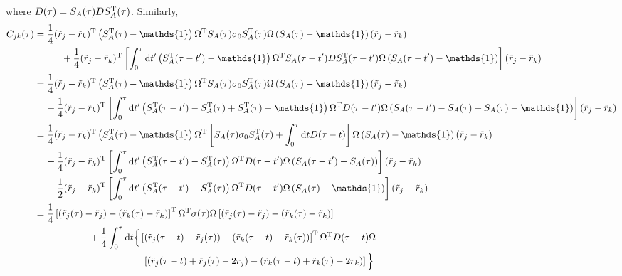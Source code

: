 \documentclass[%
reprint,
superscriptaddress,
nofootinbib,
 amsmath,amssymb,
prx,
floatfix,
]{revtex4-2}
\begin{document}
where $D(\tau) = S_A(\tau)D S_A^{\rm T}(\tau)$. Similarly, 
\begin{align*}
C_{jk} (\tau) &=   \frac{1}{4} (\tilde{r}_j - \tilde{r}_k)^{\rm T}   \left(S^{\rm T}_A(\tau) - \mathds{1} \right)  \Omega^{\rm T} S_A(\tau) \sigma_0 S^{\rm T}_A(\tau)\Omega  \left(S_A(\tau) - \mathds{1} \right)   (\tilde{r}_j - \tilde{r}_k)   \nonumber \\ 
& \hspace{1cm}+ \frac{1}{4} (\tilde{r}_j - \tilde{r}_k)^{\rm T}  \left[  \int_0^\tau \text{d} t'    \left(S^{\rm T}_A(\tau - t') - \mathds{1} \right) \Omega^{\rm T} S_A(\tau - t')   D S_A^{\rm T}(\tau - t') \Omega \left(S_A(\tau - t') - \mathds{1} \right)   \right]   (\tilde{r}_j - \tilde{r}_k) \\
&=   \frac{1}{4} (\tilde{r}_j - \tilde{r}_k)^{\rm T}   \left(S^{\rm T}_A(\tau) - \mathds{1} \right)  \Omega^{\rm T} S_A(\tau) \sigma_0 S^{\rm T}_A(\tau)\Omega  \left(S_A(\tau) - \mathds{1} \right)   (\tilde{r}_j - \tilde{r}_k)   \nonumber \\ 
& \hspace{0.4cm} + \frac{1}{4} (\tilde{r}_j - \tilde{r}_k)^{\rm T}   \left[  \int_0^\tau \text{d} t'    \left(S^{\rm T}_A(\tau - t') - S^{\rm T}_A(\tau) +  S^{\rm T}_A(\tau) - \mathds{1} \right) \Omega^{\rm T}  D(\tau - t') \Omega \left(S_A(\tau - t')  - S_A(\tau) +  S_A(\tau) - \mathds{1} \right)   \right]   (\tilde{r}_j - \tilde{r}_k) \\
&=   \frac{1}{4} (\tilde{r}_j - \tilde{r}_k)^{\rm T}   \left(S^{\rm T}_A(\tau) - \mathds{1} \right)  \Omega^{\rm T} \left[  S_A(\tau) \sigma_0 S^{\rm T}_A(\tau) + \int_0^\tau \text{d} t D(\tau - t)  \right] \Omega  \left(S_A(\tau) - \mathds{1} \right)   (\tilde{r}_j - \tilde{r}_k)   \nonumber \\ 
& \hspace{0.4cm} + \frac{1}{4} (\tilde{r}_j - \tilde{r}_k)^{\rm T}   \left[  \int_0^\tau \text{d} t'    \left(S^{\rm T}_A(\tau - t') - S^{\rm T}_A(\tau)  \right) \Omega^{\rm T}  D(\tau - t') \Omega \left(S_A(\tau - t')  - S_A(\tau)  \right)   \right]   (\tilde{r}_j - \tilde{r}_k) \\
& \hspace{0.4cm} + \frac{1}{2} (\tilde{r}_j - \tilde{r}_k)^{\rm T}   \left[  \int_0^\tau \text{d} t'    \left(S^{\rm T}_A(\tau - t') - S^{\rm T}_A(\tau)  \right) \Omega^{\rm T}  D(\tau - t') \Omega \left(S_A(\tau)  - \mathds{1} \right)   \right]   (\tilde{r}_j - \tilde{r}_k) \\
&=   \frac{1}{4} \left[ (\tilde{r}_j (\tau) - \tilde{r}_j)  - (\tilde{r}_k (\tau) - \tilde{r}_k ) \right]^{\rm T} \Omega^{\rm T} \sigma (\tau)   \Omega  \left[ (\tilde{r}_j (\tau) - \tilde{r}_j)  - (\tilde{r}_k (\tau) - \tilde{r}_k ) \right]  \nonumber \\ 
& \hspace{2cm} + \frac{1}{4}     \int_0^\tau \text{d} t   \Big\{ \left[ (\tilde{r}_j (\tau - t) - \tilde{r}_j(\tau))  - (\tilde{r}_k (\tau - t) - \tilde{r}_k(\tau))  \right]^{\rm T}  \Omega^{\rm T}  D(\tau - t) \Omega \\&\hspace{4cm}\left[ (\tilde{r}_j (\tau - t)  + \tilde{r}_j(\tau) - 2 r_j)  - (\tilde{r}_k (\tau - t) + \tilde{r}_k(\tau) - 2 r_k)  \right]  \Big\}
\end{align*}
\end{document}
